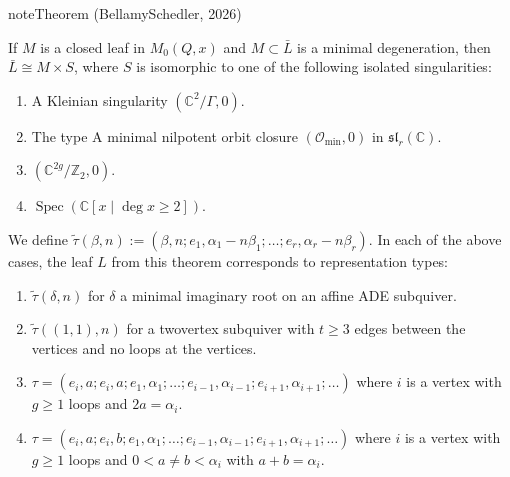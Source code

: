 \documentclass[letterpaper,10pt,english]{sphinxmanual}
\begin{document}
\begin{sphinxadmonition}{note}{Theorem (Bellamy\sphinxhyphen{}Schedler, 2026)}

\sphinxAtStartPar
If \(M\) is a closed leaf in \(M_0(Q,x)\) and \(M\subset\bar{L}\) is a minimal degeneration, then \(\bar{L}\cong M\times S\), where \(S\) is isomorphic to one of the following isolated singularities:
\begin{enumerate}
%
\item {} 
\sphinxAtStartPar
A Kleinian singularity \((\mathbb{C}^2/\Gamma, 0)\).

\item {} 
\sphinxAtStartPar
The type A minimal nilpotent orbit closure \((\mathcal{O}_{\min},0)\) in \(\mathfrak{sl}_r(\mathbb{C})\).

\item {} 
\sphinxAtStartPar
\((\mathbb{C}^{2g}/\mathbb{Z}_2,0)\).

\item {} 
\sphinxAtStartPar
\(\operatorname{Spec}(\mathbb{C}[x\mid\deg x\geq 2])\).

\end{enumerate}
\end{sphinxadmonition}

\sphinxAtStartPar
We define \(\tilde{\tau}(\beta,n):=(\beta,n;e_1,\alpha_1-n\beta_1;\dots;e_r,\alpha_r-n\beta_r)\). In each of the above cases, the leaf \(L\) from this theorem corresponds to representation types:
\begin{enumerate}
%
\item {} 
\sphinxAtStartPar
\(\tilde{\tau}(\delta,n)\) for \(\delta\) a minimal imaginary root on an affine ADE subquiver.

\item {} 
\sphinxAtStartPar
\(\tilde{\tau}((1,1),n)\) for a two\sphinxhyphen{}vertex subquiver with \(t\geq 3\) edges between the vertices and no loops at the vertices.

\item {} 
\sphinxAtStartPar
\(\tau=(e_i,a;e_i,a;e_1,\alpha_1;\dots;e_{i-1},\alpha_{i-1};e_{i+1},\alpha_{i+1};\dots)\) where \(i\) is a vertex with \(g\geq 1\) loops and \(2a=\alpha_i\).

\item {} 
\sphinxAtStartPar
\(\tau=(e_i,a;e_i,b;e_1,\alpha_1;\dots;e_{i-1},\alpha_{i-1};e_{i+1},\alpha_{i+1};\dots)\) where \(i\) is a vertex with \(g\geq 1\) loops and \(0<a\neq b<\alpha_i\) with \(a+b=\alpha_i\).

\end{enumerate}
\end{document}
